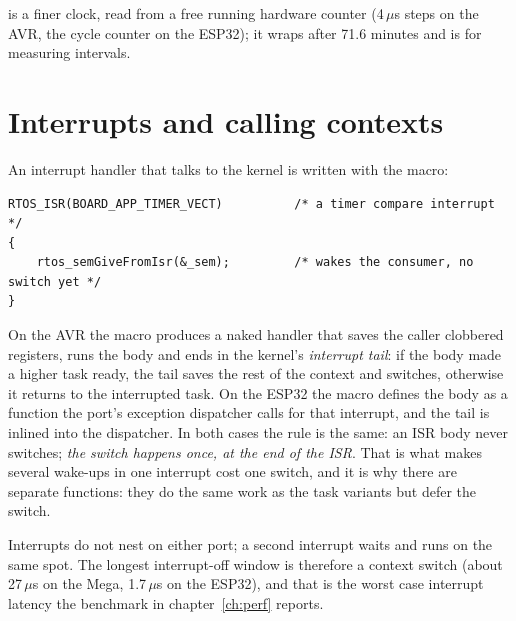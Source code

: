  is a finer clock, read from a free running hardware counter
(4\,$\mu$s steps on the AVR, the cycle counter on the ESP32); it wraps after 71.6 minutes
and is for measuring intervals.

\section{Interrupts and calling contexts}
\label{sec:contexts}

An interrupt handler that talks to the kernel is written with the 
macro:

\begin{lstlisting}
RTOS_ISR(BOARD_APP_TIMER_VECT)          /* a timer compare interrupt */
{
    rtos_semGiveFromIsr(&_sem);         /* wakes the consumer, no switch yet */
}
\end{lstlisting}

On the AVR the macro produces a naked handler that saves the caller clobbered registers,
runs the body and ends in the kernel's \emph{interrupt tail}: if the body made a higher
task ready, the tail saves the rest of the context and switches, otherwise it returns to
the interrupted task. On the ESP32 the macro defines the body as a function the port's
exception dispatcher calls for that interrupt, and the tail is inlined into the
dispatcher. In both cases the rule is the same: an ISR body never switches; \emph{the
switch happens once, at the end of the ISR}. That is what makes several wake-ups in one
interrupt cost one switch, and it is why there are separate  functions:
they do the same work as the task variants but defer the switch.

Interrupts do not nest on either port; a second interrupt waits and runs on the same
spot. The longest interrupt-off window is therefore a context switch (about 27\,$\mu$s on
the Mega, 1.7\,$\mu$s on the ESP32), and that is the worst case interrupt latency the
benchmark in chapter~\ref{ch:perf} reports.

